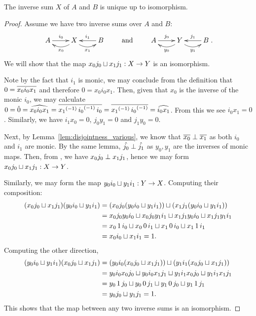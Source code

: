 \begin{lemma}\label{lem:inverse_sum_is_unique}
  The inverse sum $X$ of $A$ and $B$ is unique up to isomorphism.
\end{lemma}
\begin{proof}
  Assume we have two inverse sums over $A$ and $B$:
  \[
    \xymatrix{
      A\ar[r]^{i_0} &X\ar@/^9pt/[l]^{x_0} \ar@/_9pt/[r]_{x_1} & B \ar[l]_{i_1}
    }
    \qquad  \text{ and  }\qquad
    \xymatrix{
      A\ar[r]^{\jay_0} &Y\ar@/^9pt/[l]^{y_0} \ar@/_9pt/[r]_{y_1} & B \ar[l]_{\jay_1}
    }.
  \]
  We will show that the map $x_0 j_0 \sqcup x_1 j_1 : X \to Y$ is an isomorphism.

  Note by the fact that $i_1$ is monic, we may conclude from the definition that
  $0 = \overline{x_0 i_0 x_1}$ and therefore $0 = x_0 i_0 x_1$. Then, given that $x_0$ is the inverse
  of the monic $i_0$, we may calculate
  $0 = \hat{0} = \widehat{x_0 i_0 x_1} = \overline{{x_1}^{(-1)}\, {i_0}^{(-1)}\, i_0} =
  \overline{{x_1}^{(-1)}\, {i_0}^{(-1)}} = \widehat{i_0 x_1}$. From this we see $i_0 x_1 = 0$. Similarly, we have
  $i_1 x_0 = 0$, $j_0 y_1 =0$ and $j_1 y_0 = 0$.

  Next, by Lemma~\ref{lem:disjointness_various}, we know that $\overline{x_0}\perp\overline{x_1}$ as both
  $i_0$ and $i_1$ are monic. By the same lemma, $\hat{j_0} \perp \hat{j_1}$ as $y_0, y_1$
  are the inverses of monic maps.  Then, from , we have
  $x_0 j_0 \perp x_1 j_1$, hence we may form $x_0 j_0 \sqcup x_1 j_1 : X \to Y$.

  Similarly, we may form the map $y_0 i_0 \sqcup y_1 i_1 : Y \to X$. Computing their composition:
  \begin{align*}
    (x_0 j_0 \sqcup x_1 j_1)(y_0 i_0 \sqcup y_1 i_1)
      &= (x_0 j_0 (y_0 i_0 \sqcup y_1 i_1))\sqcup (x_1 j_1(y_0 i_0 \sqcup y_1 i_1))\\
      &= x_0 j_0 y_0 i_0 \sqcup x_0 j_0 y_1 i_1 \sqcup x_1 j_1 y_0 i_0 \sqcup x_1
        j_1 y_1 i_1 \\
      &= x_0\, 1\, i_0 \sqcup x_0\, 0\, i_1 \sqcup x_1\, 0\, i_0 \sqcup x_1\, 1\, i_1\\
      &= x_0 i_0 \sqcup x_1 i_1 = 1.
  \end{align*}
  Computing the other direction,
  \begin{align*}
    (y_0 i_0 \sqcup y_1 i_1)(x_0 j_0 \sqcup x_1 j_1)
      &= (y_0 i_0 (x_0 j_0 \sqcup x_1 j_1) )\sqcup (y_1 i_1(x_0 j_0 \sqcup x_1 j_1))\\
      &= y_0 i_0 x_0 j_0 \sqcup y_0 i_0 x_1 j_1 \sqcup y_1 i_1 x_0 j_0 \sqcup y_1 i_1 x_1 j_1\\
      &= y_0\, 1\, j_0 \sqcup y_0\, 0\, j_1 \sqcup y_1\, 0\, j_0 \sqcup y_1\, 1\, j_1\\
      &= y_0 j_0 \sqcup y_1 j_1 = 1.\\
  \end{align*}
  This shows that the map between any two inverse sums is an isomorphism.


\end{proof}

